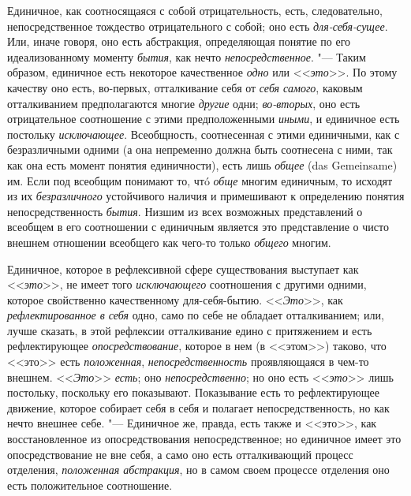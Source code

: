 {Единичное, как соотносящаяся с собой отрицательность, есть,
следовательно, непосредственное тождество отрицательного с собой; оно есть
{\em для-себя-сущее}.
Или, иначе говоря, оно есть абстракция, определяющая понятие
по его идеализованному моменту
{\em бытия}, как нечто
{\em непосредственное}. "---
Таким образом, единичное есть некоторое качественное
{\em одно} или
<<{\em это}>>. По этому
качеству оно есть, во-первых, отталкивание себя от
{\em себя самого},
каковым отталкиванием предполагаются многие
{\em другие} одни;
{\em во-вторых},
оно есть отрицательное соотношение с этими предположенными
{\em иными}, и
единичное есть постольку
{\em исключающее}.
Всеобщность, соотнесенная с этими единичными, как с
безразличными одними (а она непременно должна быть соотнесена с ними, так
как она есть момент понятия единичности), есть лишь
{\em общее} (das Gemeinsame)
им. Если под всеобщим понимают то, чтó
{\em обще} многим
единичным, то исходят из их
{\em безразличного}
устойчивого наличия и примешивают к определению понятия
непосредственность {\em бытия}.
Низшим из всех возможных представлений о всеобщем в его
соотношении с единичным является это представление о чисто внешнем
отношении всеобщего как чего-то только {\em общего} многим.

Единичное, которое в рефлексивной сфере существования
выступает как <<{\em это}>>,
не имеет того
{\em исключающего}
соотношения с другими одними, которое свойственно
качественному для-себя-бытию.
<<{\em Это}>>, как
{\em рефлектированное в себя}
одно, само по себе не обладает отталкиванием; или, лучше
сказать, в этой рефлексии отталкивание едино с
притяжением
и есть рефлектирующее
{\em опосредствование},
которое в нем (в <<этом>>) таково, что <<это>> есть {\em положенная},
{\em непосредственность} проявляющаяся в чем-то внешнем. <<{\em Это}>>
{\em есть}; оно
{\em непосредственно}; но
оно есть <<{\em это}>> лишь
постольку, поскольку его показывают. Показывание есть то рефлектирующее
движение, которое собирает себя в себя и полагает непосредственность, но
как нечто внешнее себе. "--- Единичное же,
правда, есть также и <<это>>, как восстановленное из опосредствования
непосредственное; но единичное имеет это опосредствование не вне себя, а
само оно есть отталкивающий процесс отделения,
{\em положенная
абстракция},
но в самом своем процессе отделения оно есть положительное соотношение.

}
